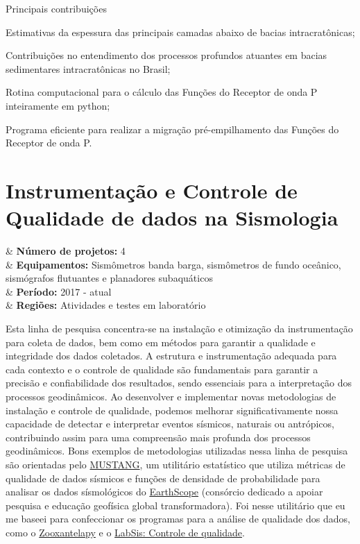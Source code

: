 \documentclass[10pt,a4paper,oneside]{book}
\begin{document}
\begin{fancyenum}{\faCogs}{Principais contribuições}
	\item Estimativas da espessura das principais camadas abaixo de bacias intracratônicas;
	\item Contribuições no entendimento dos processos profundos atuantes em bacias sedimentares intracratônicas no Brasil;
	\item Rotina computacional para o cálculo das Funções do Receptor de onda P inteiramente em python;
	\item Programa eficiente para realizar a migração pré-empilhamento das Funções do Receptor de onda P.
\end{fancyenum}

\section{Instrumentação e Controle de Qualidade de dados na Sismologia}
\label{sec_inst_qc}

\begin{summarybox}[frametitle=\faProjectDiagram{}\quad Panorama da linha de pesquisa]
	\begin{datelist}
		\faFile* & \textbf{Número de projetos:} 4 \\
		\faBinoculars & \textbf{Equipamentos:} Sismômetros banda barga, sismômetros de fundo oceânico, sismógrafos flutuantes e planadores subaquáticos \\
		\faCalendar*[regular] & \textbf{Período:} 2017 - atual \\
		\faMapMarked* & \textbf{Regiões:} Atividades e testes em laboratório \\
	\end{datelist}
\end{summarybox}

\bigskip

Esta linha de pesquisa concentra-se na instalação e otimização da instrumentação para coleta de dados, bem como em métodos para garantir a qualidade e integridade dos dados coletados. A estrutura e instrumentação adequada para cada contexto e o controle de qualidade são fundamentais para garantir a precisão e confiabilidade dos resultados, sendo essenciais para a interpretação dos processos geodinâmicos. Ao desenvolver e implementar novas metodologias de instalação e controle de qualidade, podemos melhorar significativamente nossa capacidade de detectar e interpretar eventos sísmicos, naturais ou antrópicos, contribuindo assim para uma compreensão mais profunda dos processos geodinâmicos. Bons exemplos de metodologias utilizadas nessa linha de pesquisa são orientadas pelo \href{https://services.iris.edu/mustang/}{MUSTANG}, um utilitário estatístico que utiliza métricas de qualidade de dados sísmicos e funções de densidade de probabilidade para analisar os dados sísmológicos do \href{https://www.earthscope.org/}{EarthScope} (consórcio dedicado a apoiar pesquisa e educação geofísica global transformadora). Foi nesse utilitário que eu me baseei para confeccionar os programas para a análise de qualidade dos dados, como o \href{https://zooxantelapy.readthedocs.io/}{Zooxantelapy} e o \href{https://github.com/dIOGOLOC/codes_escritos/tree/master/LabSis_controle_de_qualidade}{LabSis: Controle de qualidade}.
\end{document}
